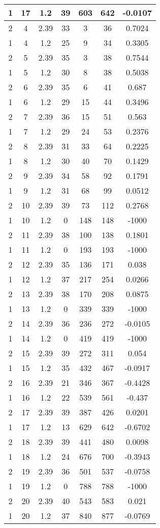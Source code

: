 \documentclass[letterpaper, 12pt]{article}
\begin{document}
\begin{longtable}{|c|c|c|c|c|c|c|}
\hline
1 & 17 & 1.2 & 39 & 603 & 642 & -0.0107 \\
\hline
2 & 4 & 2.39 & 33 & 3 & 36 & 0.7024 \\
\hline
1 & 4 & 1.2 & 25 & 9 & 34 & 0.3305 \\
\hline
2 & 5 & 2.39 & 35 & 3 & 38 & 0.7544 \\
\hline
1 & 5 & 1.2 & 30 & 8 & 38 & 0.5038 \\
\hline
2 & 6 & 2.39 & 35 & 6 & 41 & 0.687 \\
\hline
1 & 6 & 1.2 & 29 & 15 & 44 & 0.3496 \\
\hline
2 & 7 & 2.39 & 36 & 15 & 51 & 0.563 \\
\hline
1 & 7 & 1.2 & 29 & 24 & 53 & 0.2376 \\
\hline
2 & 8 & 2.39 & 31 & 33 & 64 & 0.2225 \\
\hline
1 & 8 & 1.2 & 30 & 40 & 70 & 0.1429 \\
\hline
2 & 9 & 2.39 & 34 & 58 & 92 & 0.1791 \\
\hline
1 & 9 & 1.2 & 31 & 68 & 99 & 0.0512 \\
\hline
2 & 10 & 2.39 & 39 & 73 & 112 & 0.2768 \\
\hline
1 & 10 & 1.2 & 0 & 148 & 148 & -1000 \\
\hline
2 & 11 & 2.39 & 38 & 100 & 138 & 0.1801 \\
\hline
1 & 11 & 1.2 & 0 & 193 & 193 & -1000 \\
\hline
2 & 12 & 2.39 & 35 & 136 & 171 & 0.038 \\
\hline
1 & 12 & 1.2 & 37 & 217 & 254 & 0.0266 \\
\hline
2 & 13 & 2.39 & 38 & 170 & 208 & 0.0875 \\
\hline
1 & 13 & 1.2 & 0 & 339 & 339 & -1000 \\
\hline
2 & 14 & 2.39 & 36 & 236 & 272 & -0.0105 \\
\hline
1 & 14 & 1.2 & 0 & 419 & 419 & -1000 \\
\hline
2 & 15 & 2.39 & 39 & 272 & 311 & 0.054 \\
\hline
1 & 15 & 1.2 & 35 & 432 & 467 & -0.0917 \\
\hline
2 & 16 & 2.39 & 21 & 346 & 367 & -0.4428 \\
\hline
1 & 16 & 1.2 & 22 & 539 & 561 & -0.437 \\
\hline
2 & 17 & 2.39 & 39 & 387 & 426 & 0.0201 \\
\hline
1 & 17 & 1.2 & 13 & 629 & 642 & -0.6702 \\
\hline
2 & 18 & 2.39 & 39 & 441 & 480 & 0.0098 \\
\hline
1 & 18 & 1.2 & 24 & 676 & 700 & -0.3943 \\
\hline
2 & 19 & 2.39 & 36 & 501 & 537 & -0.0758 \\
\hline
1 & 19 & 1.2 & 0 & 788 & 788 & -1000 \\
\hline
2 & 20 & 2.39 & 40 & 543 & 583 & 0.021 \\
\hline
1 & 20 & 1.2 & 37 & 840 & 877 & -0.0769 \\
\hline
\end{longtable}
\end{document}
